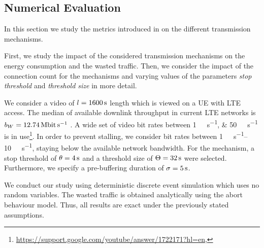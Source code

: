 \subsection{Numerical Evaluation}\label{sec:application:lte_video:numerical_evaluation}

In this section we study the metrics introduced in  on the different transmission mechanisms.

First, we study the impact of the considered transmission mechanisms on the energy consumption and the wasted traffic. 
Then, we consider the impact of the connection count for the \streaming mechanisms and varying values of the parameters \emph{stop threshold} \bufferlower and \emph{threshold size} \buffersize in more detail.

We consider a video of \(l=\SI{1600}{\second}\) length which is viewed on a \gls{UE} with \gls{LTE} access.
The median of available downlink throughput in current \gls{LTE} networks is \(\bandwidth = \SI{12.74}{\mega\bit\per\second}\) \cite{Huang2012}.
A wide set of video bit rates between \SIlist{1;50}{\mega\bit\per\second} is in use\footnote{\url{https://support.google.com/youtube/answer/1722171?hl=en}, \accessed}.
In order to prevent stalling, we consider bit rates between \SIrange{1}{10}{\mega\bit\per\second}, staying below the available network bandwidth.
For the \streaming mechanism, a stop threshold of \(\theta = \SI{4}{\second}\) and a threshold size of \(\Theta = \SI{32}{\second}\) were selected.
Furthermore, we specify a pre-buffering duration of \(\sigma = \SI{5}{\second}\).

We conduct our study using deterministic discrete event simulation which uses no random variables.
The wasted traffic is obtained analytically using the abort behaviour model.
Thus, all results are exact under the previously stated assumptions.

